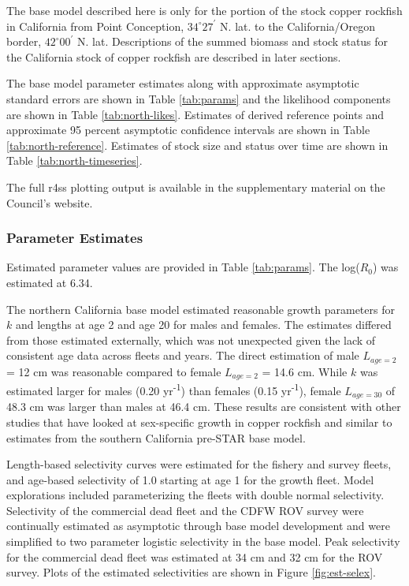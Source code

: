 \documentclass[11pt,
  english,
  letterpaper,
]{article}
\begin{document}
The base model described here is only for the portion of the stock copper rockfish in California from Point Conception, $34^\circ 27^\prime$ N. lat. to the California/Oregon border, $42^\circ 00^\prime$ N. lat. Descriptions of the summed biomass and stock status for the California stock of copper rockfish are described in later sections.

The base model parameter estimates along with approximate asymptotic standard errors are shown in Table \ref{tab:params} and the likelihood components are shown in Table \ref{tab:north-likes}. Estimates of derived reference points and approximate 95 percent asymptotic confidence intervals are shown in Table \ref{tab:north-reference}. Estimates of stock size and status over time are shown in Table \ref{tab:north-timeseries}.

The full r4ss plotting output is available in the supplementary material on the Council's website.

\hypertarget{parameter-estimates}{%
\subsubsection{Parameter Estimates}\label{parameter-estimates}}

Estimated parameter values are provided in Table \ref{tab:params}. The log(\(R_0\)) was estimated at 6.34.

The northern California base model estimated reasonable growth parameters for \(k\) and lengths at age 2 and age 20 for males and females. The estimates differed from those estimated externally, which was not unexpected given the lack of consistent age data across fleets and years. The direct estimation of male \(L_{age=2}\) = 12 cm was reasonable compared to female \(L_{age=2}\) = 14.6 cm. While \(k\) was estimated larger for males (0.20 yr\textsuperscript{-1}) than females (0.15 yr\textsuperscript{-1}), female \(L_{age=30}\) of 48.3 cm was larger than males at 46.4 cm. These results are consistent with other studies that have looked at sex-specific growth in copper rockfish and similar to estimates from the southern California pre-STAR base model.

Length-based selectivity curves were estimated for the fishery and survey fleets, and age-based selectivity of 1.0 starting at age 1 for the growth fleet. Model explorations included parameterizing the fleets with double normal selectivity. Selectivity of the commercial dead fleet and the CDFW ROV survey were continually estimated as asymptotic through base model development and were simplified to two parameter logistic selectivity in the base model. Peak selectivity for the commercial dead fleet was estimated at 34 cm and 32 cm for the ROV survey. Plots of the estimated selectivities are shown in Figure \ref{fig:est-selex}.
\end{document}
